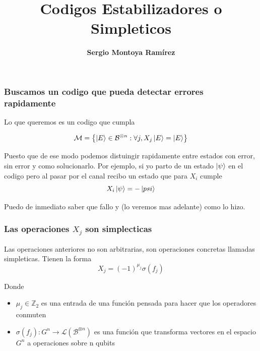 \documentclass[english,9pt]{Linnaeus}
\author[S1e7J]{\textbf{Sergio Montoya Ramírez}}
\institute{s.montoyar2@uniandes.edu.co}
\title{\LARGE \textbf{Codigos Estabilizadores o Simpleticos}}
\date{}
\begin{document}
\begin{frame}[plain]
\titlepage
\end{frame}


\begin{frame}
  \frametitle{Buscamos un codigo que pueda detectar errores rapidamente}

  Lo que queremos es un codigo que cumpla

  \begin{equation}
    \mathcal{M} = \left\{ \ket{E} \in \mathcal{B}^{\otimes n} : \forall j, X_j \ket{E} = \ket{E}\right\}
    \label{eq:stabilizers}
  \end{equation}

  Puesto que de ese modo podemos distuingir rapidamente entre estados con error, sin error y como solucionarlo. Por ejemplo, si yo parto de un estado $\ket{\psi}$ en el codigo pero al pasar por el canal recibo un estado que para $X_i$ cumple
  \begin{equation}
    X_i \ket{\psi} = - \ket{psi}
    \label{eq:stabilizers2}
  \end{equation}

  Puedo de inmediato saber que fallo y (lo veremos mas adelante) como lo hizo.
\end{frame}


\begin{frame}
  \frametitle{Las operaciones $X_j$ son simplecticas}

  Las operaciones anteriores no son arbitrarias, son operaciones concretas llamadas simpleticas. Tienen la forma
  \begin{equation}
    X_j = (-1)^{\mu_j} \sigma(f_j)
    \label{eq:simpletic}
  \end{equation}

  Donde
  \begin{itemize}
    \item $\mu_j \in \mathbb{Z}_2$ es una entrada de una función pensada para hacer que los operadores conmuten
    \item $\sigma(f_j) : G^n \to \mathcal{L}(\mathcal{B}^{\otimes n})$ es una función que transforma vectores en el espacio $G^n$ a operaciones sobre n qubits
  \end{itemize}
\end{frame}
\end{document}
